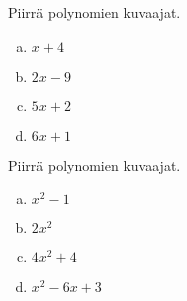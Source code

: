 \begin{tehtava}
    Piirrä polynomien kuvaajat.
    \begin{enumerate}[a)]
        \item $x+4$
        \item $2x-9$
        \item $5x+2$
        \item $6x+1$
    \end{enumerate}
    \begin{vastaus}
        \item \begin{kuvaajapohja}{0.4}{-4}{4}{-1}{7}
			  \end{kuvaajapohja}
    	\item \begin{kuvaajapohja}{0.4}{-2}{6}{-6}{2}
			  \end{kuvaajapohja}
		\item \begin{kuvaajapohja}{0.4}{-4}{4}{-2}{6}
			  \end{kuvaajapohja}
		\item \begin{kuvaajapohja}{0.4}{-4}{4}{-2}{6}
			  \end{kuvaajapohja}
    \end{vastaus}
\end{tehtava}

\begin{tehtava}
    Piirrä polynomien kuvaajat.
    \begin{enumerate}[a)]
        \item $x^2-1$
        \item $2x^2$
        \item $4x^2+4$
        \item $x^2-6x+3$
    \end{enumerate}
    \begin{vastaus}
        \item \begin{kuvaajapohja}{0.4}{-4}{4}{-2}{6}
			  \end{kuvaajapohja}
    	\item \begin{kuvaajapohja}{0.4}{-4}{4}{-1}{7}
			  \end{kuvaajapohja}
		\item \begin{kuvaajapohja}{0.4}{-4}{4}{-1}{11}
			  \end{kuvaajapohja}
		\item \begin{kuvaajapohja}{0.4}{-1}{7}{-7}{5}
			  \end{kuvaajapohja}
    \end{vastaus}
\end{tehtava}

